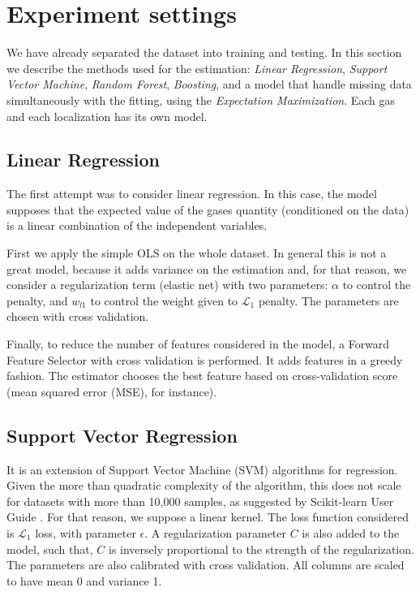 \section{Experiment settings}
\label{sec:experiments}

We have already separated the dataset into training and testing. In this
section we describe the methods used for the estimation: {\em Linear
Regression}, {\em Support Vector Machine}, {\em Random Forest}, {\em
Boosting}, and a model that handle missing data simultaneously with the
fitting, using the {\em Expectation Maximization}. Each gas and each
localization has its own model. 

\subsection{Linear Regression}

The first attempt was to consider linear regression. In this case, the model
supposes that the expected value of the gases quantity (conditioned on the
data) is a linear combination of the independent variables. 

First we apply the simple OLS on the whole dataset. In general this is not a
great model, because it adds variance on the estimation and, for that reason, we consider a regularization term (elastic
net) with two parameters: $\alpha$ to control the penalty, and $w_{l1}$ to
control the weight given to $\mathcal{L}_1$ penalty. The parameters are chosen
with cross validation. 

Finally, to reduce the number of features considered in the model, a
Forward Feature Selector with cross validation is performed. It adds features
in a greedy fashion. The estimator chooses the best feature based on
cross-validation score (mean squared error (MSE), for instance). 

\subsection{Support Vector Regression}

It is an extension of Support Vector Machine (SVM) algorithms for
regression. Given the more than quadratic complexity of the algorithm, this
does not scale for datasets with more than 10,000 samples, as suggested by Scikit-learn User Guide \cite{svr-function,
scikit-learn}. For that reason, we
suppose a linear kernel. The loss function considered is $\mathcal{L}_1$ loss,
with parameter $\epsilon$. A regularization parameter $C$ is also added to the
model, such that, $C$ is inversely proportional to the strength of the
regularization. The parameters are also calibrated with cross validation. All
columns are scaled to have mean 0 and variance 1. 

